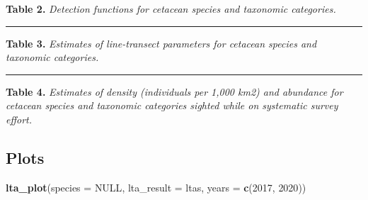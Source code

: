 \documentclass[
]{book}
\newenvironment{Shaded}{\begin{snugshade}}{\end{snugshade}}
\newcommand{\DataTypeTok}[1]{\textcolor[rgb]{0.13,0.29,0.53}{#1}}
\newcommand{\DecValTok}[1]{\textcolor[rgb]{0.00,0.00,0.81}{#1}}
\newcommand{\KeywordTok}[1]{\textcolor[rgb]{0.13,0.29,0.53}{\textbf{#1}}}
\newcommand{\NormalTok}[1]{#1}
\newcommand{\OperatorTok}[1]{\textcolor[rgb]{0.81,0.36,0.00}{\textbf{#1}}}
\newcommand{\OtherTok}[1]{\textcolor[rgb]{0.56,0.35,0.01}{#1}}
\begin{document}
\textbf{Table 2.} \emph{Detection functions for cetacean species and taxonomic categories.}

\begin{Shaded}
\end{Shaded}

\begin{center}\rule{0.5\linewidth}{0.5pt}\end{center}

\textbf{Table 3.} \emph{Estimates of line-transect parameters for cetacean species and taxonomic categories.}

\begin{Shaded}
\end{Shaded}

\begin{center}\rule{0.5\linewidth}{0.5pt}\end{center}

\textbf{Table 4.} \emph{Estimates of density (individuals per 1,000 km2) and abundance for cetacean species and taxonomic categories sighted while on systematic survey effort.}

\begin{Shaded}
\end{Shaded}

\hypertarget{plots-1}{%
\subsection*{Plots}\label{plots-1}}

\begin{Shaded}
\begin{Highlighting}[]
\KeywordTok{lta_plot}\NormalTok{(}\DataTypeTok{species =} \OtherTok{NULL}\NormalTok{, }
         \DataTypeTok{lta_result =}\NormalTok{ ltas, }
         \DataTypeTok{years =} \KeywordTok{c}\NormalTok{(}\DecValTok{2017}\NormalTok{, }\DecValTok{2020}\NormalTok{))}
\end{Highlighting}
\end{Shaded}
\end{document}
